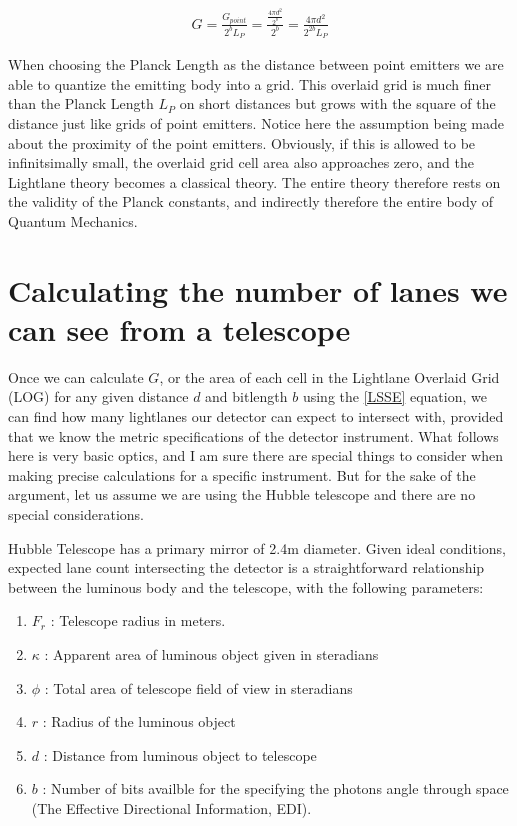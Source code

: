 \documentclass[notitlepage]{article}
\begin{document}
\begin{align}
\label{numberOfProjectingPoints}
G =\frac{G_{point}}{2^b L_P}  = \frac{ \frac{4\pi d^2}{2^b}}{ 2^b}  = \frac{ 4\pi d^2}{ 2^{2b} L_P } 
\end{align}

When choosing the Planck Length as the distance between point emitters we are able to quantize the emitting body into a grid. This overlaid grid is much finer than the Planck Length $L_P$ on short distances but grows with the square of the distance just like grids of point emitters. 
Notice here the assumption being made about the proximity of the point emitters. Obviously, if this is allowed to be infinitsimally small, the overlaid grid cell area also approaches zero, and the Lightlane theory becomes a classical theory. The entire theory therefore rests on the validity of the Planck constants, and indirectly therefore the entire body of Quantum Mechanics. 

\section{Calculating the number of lanes we can see from a telescope }
Once we can calculate $G$, or the area of each cell in the Lightlane Overlaid Grid (LOG) for any given distance $d$ and bitlength $b$ using the \ref{LSSE} equation, we can find how many lightlanes our detector can expect to intersect with, provided that we know the metric specifications of the detector instrument. What follows here is very basic optics, and I am sure there are special things to consider when making precise calculations for a specific instrument. But for the sake of the argument, let us assume we are using the Hubble telescope and there are no special considerations. 

Hubble Telescope has a primary mirror of 2.4m diameter. Given ideal conditions, expected lane count intersecting the detector is a straightforward relationship between the luminous body and the telescope, with the following parameters:

\begin{enumerate}

\item $F_r$ : Telescope radius in meters.
\item $\kappa$ : Apparent area of luminous object given in steradians
\item $\phi$ : Total area of telescope field of view in steradians
\item $r$ : Radius of the luminous object
\item $d$ : Distance from luminous object to telescope
\item $b$ : Number of bits availble for the specifying the photons angle through space (The Effective Directional Information, EDI).

\end{enumerate}
\end{document}
